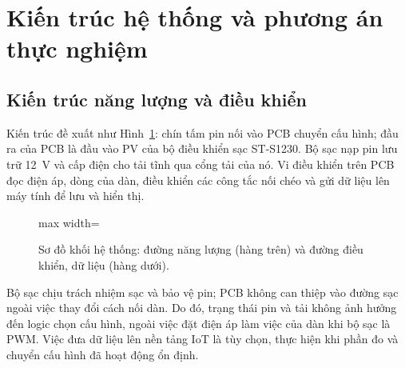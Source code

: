 \section{Kiến trúc hệ thống và phương án thực nghiệm}
\label{sec:architecture}

\subsection{Kiến trúc năng lượng và điều khiển}

Kiến trúc đề xuất như Hình~\ref{fig:energy}: chín tấm pin nối vào PCB chuyển cấu hình; đầu ra của PCB là đầu vào PV của bộ điều khiển sạc ST-S1230. Bộ sạc nạp pin lưu trữ 12~V và cấp điện cho tải tĩnh qua cổng tải của nó. Vi điều khiển trên PCB đọc điện áp, dòng của dàn, điều khiển các công tắc nối chéo và gửi dữ liệu lên máy tính để lưu và hiển thị.

\begin{figure}[H]
\centering
\begin{adjustbox}{max width=\linewidth}
\end{adjustbox}
\caption{Sơ đồ khối hệ thống: đường năng lượng (hàng trên) và đường điều khiển, dữ liệu (hàng dưới).}
\label{fig:energy}
\end{figure}

Bộ sạc chịu trách nhiệm sạc và bảo vệ pin; PCB không can thiệp vào đường sạc ngoài việc thay đổi cách nối dàn. Do đó, trạng thái pin và tải không ảnh hưởng đến logic chọn cấu hình, ngoài việc đặt điện áp làm việc của dàn khi bộ sạc là PWM. Việc đưa dữ liệu lên nền tảng IoT là tùy chọn, thực hiện khi phần đo và chuyển cấu hình đã hoạt động ổn định.

